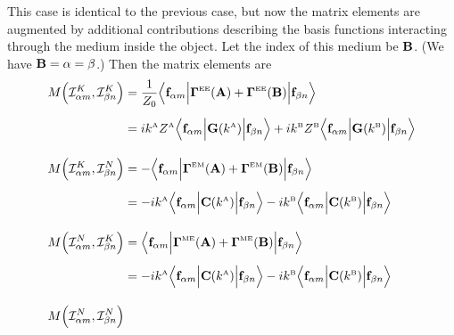 \documentclass[dvips,letterpaper]{article}
\newcommand{\BG}{\boldsymbol{\Gamma}}
\begin{document}
\begin{enumerate}
This case is identical to the previous case, but now the matrix elements
are augmented by additional contributions describing the basis functions
interacting through the medium inside the object. Let the index
of this medium be $\mathbf{B}$. (We have $\mathbf{B}=\alpha=\beta$.) Then
the matrix elements are 
\begin{align*}
 M\Big( \mathcal{I}^K_{\alpha m}, \mathcal{I}^K_{\beta n} \Big) 
 &= \frac{1}{Z_0}
    \Big\langle \vb f_{\alpha m} 
    \Big| \BG\supt{EE}(\vb A) + \BG\supt{EE}(\vb B) \Big|
                \vb f_{\beta n} 
    \Big\rangle
\\[5pt]
 &= ik\supt{A} Z\supt{A}
    \Big\langle \vb f_{\alpha m} 
                 \Big| \vb G(k\supt{A}) \Big|
                 \vb f_{\beta n} 
    \Big\rangle
    +
    ik\supt{B} Z\supt{B}
    \Big\langle \vb f_{\alpha m} 
                 \Big| \vb G(k\supt{B}) \Big|
                 \vb f_{\beta n} 
    \Big\rangle
\\[10pt]
 M\Big( \mathcal{I}^K_{\alpha m}, \mathcal{I}^N_{\beta n} \Big) 
 &= -\Big\langle \vb f_{\alpha m} 
    \Big| \BG\supt{EM}(\vb A) + \BG\supt{EM}(\vb B) \Big|
                \vb f_{\beta n} 
    \Big\rangle
\\[5pt]
 &= -ik\supt{A}
    \Big\langle \vb f_{\alpha m} 
                 \Big| \vb C(k\supt{A}) \Big|
                 \vb f_{\beta n} 
    \Big\rangle
    -ik\supt{B}
    \Big\langle \vb f_{\alpha m} 
                 \Big| \vb C(k\supt{B}) \Big|
                 \vb f_{\beta n} 
    \Big\rangle
\\[10pt]
 M\Big( \mathcal{I}^N_{\alpha m}, \mathcal{I}^K_{\beta n} \Big) 
 &= \Big\langle \vb f_{\alpha m} 
    \Big| \BG\supt{ME}(\vb A) + \BG\supt{ME}(\vb B) \Big|
                \vb f_{\beta n} 
    \Big\rangle
\\[5pt]
 &= -ik\supt{A}
    \Big\langle \vb f_{\alpha m} 
                 \Big| \vb C(k\supt{A}) \Big|
                 \vb f_{\beta n} 
    \Big\rangle
    -ik\supt{B}
    \Big\langle \vb f_{\alpha m} 
                 \Big| \vb C(k\supt{B}) \Big|
                 \vb f_{\beta n} 
    \Big\rangle
\\[10pt]
 M\Big( \mathcal{I}^N_{\alpha m}, \mathcal{I}^N_{\beta n} \Big) 

\end{align*}
\end{enumerate}
\end{document}
